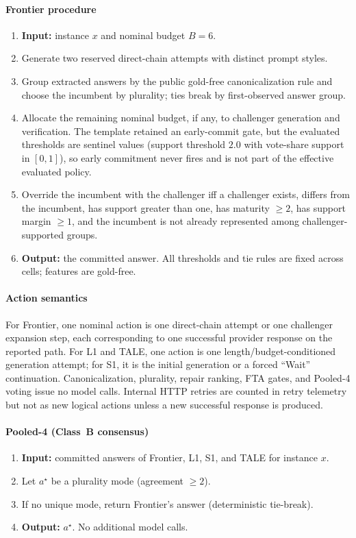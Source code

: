\paragraph{Frontier procedure}
\begin{enumerate}
\item \textbf{Input:} instance $x$ and nominal budget $B{=}6$.
\item Generate two reserved direct-chain attempts with distinct prompt styles.
\item Group extracted answers by the public gold-free canonicalization rule and choose the incumbent
by plurality; ties break by first-observed answer group.
\item Allocate the remaining nominal budget, if any, to challenger generation and
verification. The template retained an early-commit gate, but the evaluated thresholds are sentinel
values (support threshold $2.0$ with vote-share support in $[0,1]$), so early commitment never fires
and is not part of the effective evaluated policy.
\item Override the incumbent with the challenger iff a challenger exists, differs from the
incumbent, has support greater than one, has maturity $\geq 2$, has support margin $\geq 1$, and the
incumbent is not already represented among challenger-supported groups.
\item \textbf{Output:} the committed answer. All thresholds and tie rules are fixed across cells;
features are gold-free.
\end{enumerate}

\paragraph{Action semantics}
For Frontier, one nominal action is one direct-chain attempt or one challenger expansion step, each
corresponding to one successful provider response on the reported path. For L1 and TALE, one action
is one length/budget-conditioned generation attempt; for S1, it is the initial generation or a
forced ``Wait'' continuation. Canonicalization, plurality, repair ranking, FTA gates, and Pooled-4
voting issue no model calls. Internal HTTP retries are counted in retry telemetry but not as new
logical actions unless a new successful response is produced.

\paragraph{Pooled-4 (Class~B consensus)}
\begin{enumerate}
\item \textbf{Input:} committed answers of Frontier, L1, S1, and TALE for instance $x$.
\item Let $a^\star$ be a plurality mode (agreement $\geq 2$).
\item If no unique mode, return Frontier's answer (deterministic tie-break).
\item \textbf{Output:} $a^\star$. No additional model calls.
\end{enumerate}

